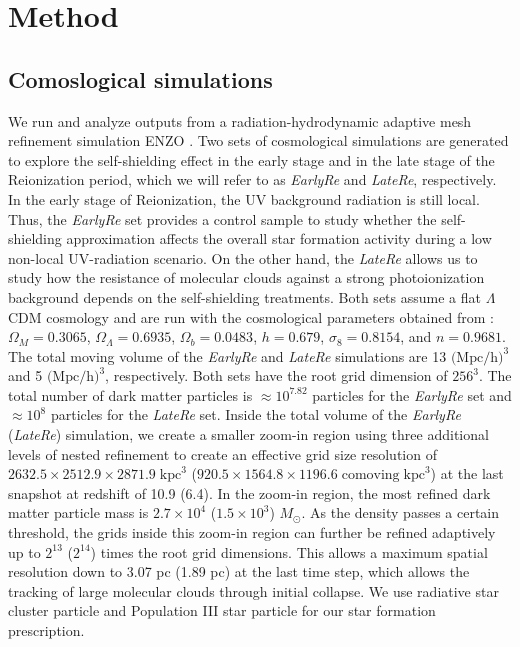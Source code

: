 \documentclass[linenumbers, twocolumn]{aastex631}
\newcommand{\acorr}[1]{\textbf{\textcolor{green}{#1}}}
\begin{document}


\section{Method} \label{sec:method}
\subsection{Comoslogical simulations}
We run and analyze outputs from a radiation-hydrodynamic adaptive mesh refinement simulation ENZO \citep{Bryan+2014}. Two sets of cosmological simulations are generated to explore the self-shielding effect in the early stage and in the late stage of the Reionization period, which we will refer to as \textit{EarlyRe} and \textit{LateRe}, respectively. In the early stage of Reionization, the UV background radiation is still local. Thus, the \textit{EarlyRe} set provides a control sample to study whether the self-shielding approximation affects the overall star formation activity during a low non-local UV-radiation scenario. On the other hand, the \textit{LateRe} allows us to study how the resistance of molecular clouds against a strong photoionization background depends on the self-shielding treatments. Both sets assume a flat $\Lambda$CDM cosmology and are run with the cosmological parameters obtained from \cite{PlanckCollaboration+2016}: $\Omega_{M} = 0.3065$, $\Omega_{\Lambda} = 0.6935$, $\Omega_{b} = 0.0483$, $h = 0.679$, $\sigma_{8} = 0.8154$, and $n = 0.9681$. The total moving volume of the \textit{EarlyRe} and \textit{LateRe} simulations are 13 $\text{(Mpc/h)}^{3}$ and 5 $\text{(Mpc/h)}^{3}$, respectively. Both sets have the root grid dimension of $256^{3}$. The total number of dark matter particles is $\approx 10^{7.82}$ particles for the \textit{EarlyRe} set and $\approx 10^{8}$ particles for the \textit{LateRe} set. Inside the total volume of the \textit{EarlyRe} (\textit{LateRe}) simulation, we create a smaller zoom-in region using three additional levels of nested refinement to create an effective grid size resolution of $2632.5 \times 2512.9 \times 2871.9 \; \text{kpc}^{3}$ ($920.5 \times 1564.8 \times 1196.6 \; \text{comoving} \; \text{kpc}^{3}$) at the last snapshot at redshift of 10.9 (6.4). In the zoom-in region, the most refined dark matter particle mass is $2.7\times 10^{4}$ ($1.5\times 10^{3}$) $M_\odot$. As the density passes a certain threshold, the grids inside this zoom-in region can further be refined adaptively up to $2^{13}$ ($2^{14}$) times the root grid dimensions. This allows a maximum spatial resolution down to 3.07 pc (1.89 pc) at the last time step, which allows the tracking of large molecular clouds through initial collapse. We use radiative star cluster particle \citep{Wise+2009} and Population III star particle \citep{Abel+2007} for our star formation prescription. 
\end{document}
